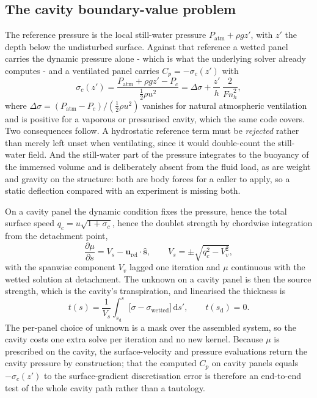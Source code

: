 \documentclass[11pt,a4paper]{article}
\newcommand{\Fnh}{\mathit{Fn}_h}
\newcommand{\dd}{\mathrm{d}}
\begin{document}
\subsection{The cavity boundary-value problem}
\label{subsec:Cavity}

The reference pressure is the local still-water pressure
$P_{\mathrm{atm}} + \rho g z'$, with $z'$ the depth below the undisturbed
surface. Against that reference a wetted panel carries the dynamic pressure
alone - which is what the underlying solver already computes - and a ventilated
panel carries $C_p = -\sigma_c(z')$ with
%
\begin{equation}
  \sigma_c(z') = \frac{P_{\mathrm{atm}} + \rho g z' - P_c}{\tfrac12\rho u^2}
               = \Delta\sigma + \frac{z'}{h}\,\frac{2}{\Fnh^{2}} ,
  \label{eq:sigmac}
\end{equation}
%
where $\Delta\sigma = (P_{\mathrm{atm}} - P_c)/(\tfrac12\rho u^2)$ vanishes for
natural atmospheric ventilation and is positive for a vaporous or pressurised
cavity, which the same code covers. Two consequences follow. A hydrostatic
reference term must be \emph{rejected} rather than merely left unset when
ventilating, since it would double-count the still-water field. And the
still-water part of the pressure integrates to the buoyancy of the immersed
volume and is deliberately absent from the fluid load, as are weight and gravity
on the structure: both are body forces for a caller to apply, so a static
deflection compared with an experiment is missing both.

On a cavity panel the dynamic condition fixes the pressure, hence the total
surface speed $q_c = u\sqrt{1+\sigma_c}$, hence the doublet strength by
chordwise integration from the detachment point,
%
\begin{equation}
  \frac{\partial\mu}{\partial s} = V_s
    - \mathbf{u}_{\mathrm{rel}}\!\cdot\!\hat{\mathbf{s}} ,
  \qquad
  V_s = \pm\sqrt{q_c^{2} - V_v^{2}} ,
  \label{eq:dynamic}
\end{equation}
%
with the spanwise component $V_v$ lagged one iteration and $\mu$ continuous with
the wetted solution at detachment. The unknown on a cavity panel is then the
source strength, which is the cavity's transpiration, and linearised the
thickness is
%
\begin{equation}
  t(s) = \frac{1}{V_s}\int_{s_{\mathrm{d}}}^{s}
         \bigl[\sigma - \sigma_{\mathrm{wetted}}\bigr]\,\dd s' ,
  \qquad t(s_{\mathrm{d}}) = 0 .
  \label{eq:thickness}
\end{equation}
%
The per-panel choice of unknown is a mask over the assembled system, so the
cavity costs one extra solve per iteration and no new kernel. Because $\mu$ is
prescribed on the cavity, the surface-velocity and pressure evaluations return
the cavity pressure by construction; that the computed $C_p$ on cavity panels
equals $-\sigma_c(z')$ to the surface-gradient discretisation error is therefore
an end-to-end test of the whole cavity path rather than a tautology.
\end{document}
